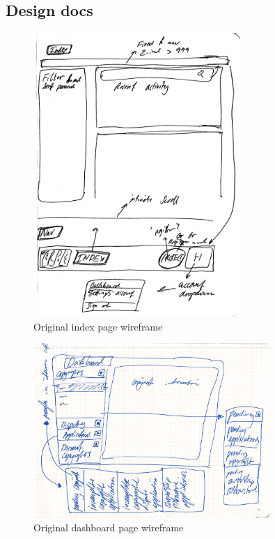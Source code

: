 \subsection{Design docs}

\begin{figure}[H]
\caption{Original index page wireframe}
\centering
\includegraphics[width=0.7\textwidth,height=\textheight,keepaspectratio]{images/appendix/design/docs/index}
\end{figure}

\begin{figure}[H]
\caption{Original dashboard page wireframe}
\centering
\includegraphics[width=0.8\textwidth,height=\textheight,keepaspectratio]{images/appendix/design/docs/dash}
\end{figure}

